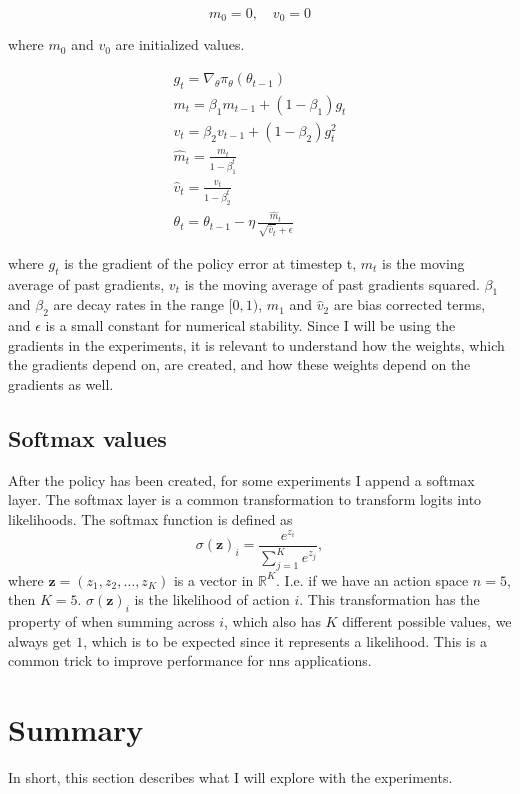 \documentclass[UKenglish]{uiomasterthesis}
\begin{document}
\[
m_0 = 0, \quad v_0 = 0
\]

where $m_0$ and $v_0$ are initialized values.

\begin{equation*}
\begin{gathered}
  g_t = \nabla_{\theta} \pi_\theta(\theta_{t-1}) \\
  m_t = \beta_1 m_{t-1} + (1 - \beta_1) g_t \\
  v_t = \beta_2 v_{t-1} + (1 - \beta_2) g_t^2 \\
  \hat{m}_t = \frac{m_t}{1 - \beta_1^t} \\
  \hat{v}_t = \frac{v_t}{1 - \beta_2^t} \\
  \theta_t = \theta_{t-1} - \eta \, \frac{\hat{m}_t}{\sqrt{\hat{v}_t} + \epsilon}
\end{gathered}
\end{equation*}

where $g_t$ is the gradient of the policy error at timestep t, $m_t$ is the moving average of past gradients, $v_t$ is the moving average of past gradients squared. $\beta_1$ and $\beta_2$ are decay rates in the range $[0,1)$, $\hat m_1$ and $\hat v_2$ are bias corrected terms, and $\epsilon$ is a small constant for numerical stability. Since I will be using the gradients in the experiments, it is relevant to understand how the weights, which the gradients depend on, are created, and how these weights depend on the gradients as well.

\subsection{Softmax values}
After the policy has been created, for some experiments I append a softmax layer. The softmax layer is a common transformation to transform logits into likelihoods\cite{softmax}. The softmax function is defined as
\[
\sigma(\mathbf{z})_i = \frac{e^{z_i}}{\sum_{j=1}^K e^{z_j}},
\]
where \( \mathbf{z} = (z_1, z_2, \ldots, z_K) \) is a vector in \( \mathbb{R}^K \). I.e. if we have an action space $n=5$, then $K=5$. $\sigma(\mathbf{z})_i$ is the likelihood of action $i$. This transformation has the property of when summing across $i$, which also has $K$ different possible values, we always get $1$, which is to be expected since it represents a likelihood. This is a common trick to improve performance for \acp{nn} applications.

\section{Summary}
In short, this section describes what I will explore with the experiments.
\end{document}
